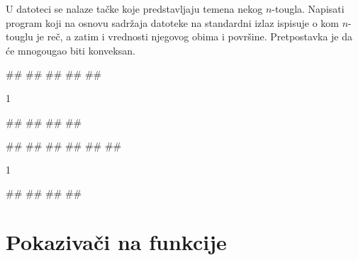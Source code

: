 \begin{Exercise}[difficulty=2, label=341]
U datoteci  se nalaze tačke koje predstavljaju
temena nekog $n$-tougla. Napisati program koji na osnovu
sadržaja datoteke na standardni izlaz ispisuje o kom
$n$-touglu je reč, a zatim i vrednosti njegovog obima i
površine. Pretpostavka je da će mnogougao biti konveksan.

\begin{miditest}
\begin{upotreba}{1}
##
##
##
##
##
\end{upotreba}
\end{miditest}
\begin{miditest}
\begin{test2}{1}



#\naslovInt#
##
##
##
\end{test2}
\end{miditest}

\begin{miditest}
\begin{upotreba}{2}
##
##
##
##
##
##
\end{upotreba}
\end{miditest}
\begin{miditest}
\begin{test2}{1}



#\naslovInt#
##
##
##
\end{test2}
\end{miditest}
\end{Exercise}

\section{Pokazivači na funkcije}

